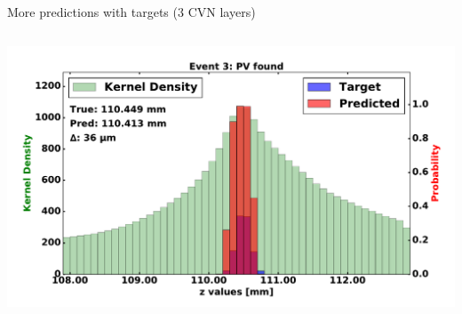 \begin{frame}{More predictions with targets (3 CVN layers)}
\begin{columns}[c]
\begin{center}
           \includegraphics[width=1\textwidth, height=0.45\textwidth, trim=18 0 18 0]{images/120000_3layer_19.pdf}
       \end{center}
  \end{columns}
\end{frame}

